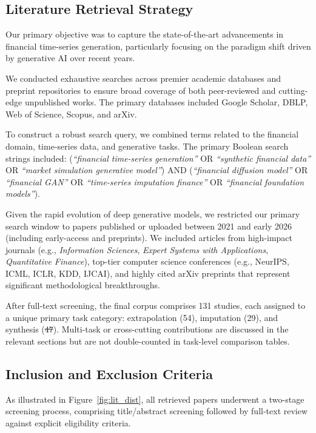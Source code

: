 \documentclass[11pt,a4paper]{article}
\makeatletter
\providecommand{\DIFaddtex}[1]{{\protect\color{blue}\uwave{#1}}} %
\providecommand{\DIFdeltex}[1]{{\protect\color{red}\sout{#1}}} %
\providecommand{\DIFaddbegin}{} %
\providecommand{\DIFaddend}{} %
\providecommand{\DIFdelbegin}{} %
\providecommand{\DIFdelend}{} %
\providecommand{\DIFadd}[1]{\texorpdfstring{\DIFaddtex{#1}}{#1}} %
\providecommand{\DIFdel}[1]{\texorpdfstring{\DIFdeltex{#1}}{}} %
\providecommand{\DIFscaledelfig}{0.5}
\newlength{\DIFdelgraphicswidth} %
\newlength{\DIFdelgraphicsheight} %
\providecommand{\DIFaddincludegraphics}[2][]{{\color{blue}\fbox{\DIFOincludegraphics[#1]{#2}}}} %
\providecommand{\DIFdelincludegraphics}[2][]{%
\sbox{\DIFdelgraphicsbox}{\DIFOincludegraphics[#1]{#2}}%
\settoboxwidth{\DIFdelgraphicswidth}{\DIFdelgraphicsbox} %
\settoboxtotalheight{\DIFdelgraphicsheight}{\DIFdelgraphicsbox} %
\scalebox{\DIFscaledelfig}{%
\parbox[b]{\DIFdelgraphicswidth}{\usebox{\DIFdelgraphicsbox}\\[-\baselineskip] \rule{\DIFdelgraphicswidth}{0em}}\llap{\resizebox{\DIFdelgraphicswidth}{\DIFdelgraphicsheight}{%
\setlength{\unitlength}{\DIFdelgraphicswidth}%
\begin{picture}(1,1)%
\thicklines\linethickness{2pt} %
{\color[rgb]{1,0,0}\put(0,0){\framebox(1,1){}}}%
{\color[rgb]{1,0,0}\put(0,0){\line( 1,1){1}}}%
{\color[rgb]{1,0,0}\put(0,1){\line(1,-1){1}}}%
\end{picture}%
}\hspace*{3pt}}} %
} %
\DeclareRobustCommand{\DIFaddbegin}{\DIFOaddbegin \let\includegraphics\DIFaddincludegraphics} %
\DeclareRobustCommand{\DIFaddend}{\DIFOaddend \let\includegraphics\DIFOincludegraphics} %
\DeclareRobustCommand{\DIFdelbegin}{\DIFOdelbegin \let\includegraphics\DIFdelincludegraphics} %
\DeclareRobustCommand{\DIFdelend}{\DIFOaddend \let\includegraphics\DIFOincludegraphics} %
\let\sout@orig\sout %
\renewcommand{\sout}[1]{\ifmmode\text{\sout@orig{\ensuremath{#1}}}\else\sout@orig{#1}\fi} %
\makeatother
\begin{document}
\subsection{Literature Retrieval Strategy}
Our primary objective was to capture the state-of-the-art advancements in financial time-series generation, particularly focusing on the paradigm shift driven by generative AI over recent years.

We conducted exhaustive searches across premier academic databases and preprint repositories to ensure broad coverage of both peer-reviewed and cutting-edge unpublished works. The primary databases included Google Scholar, DBLP, Web of Science, Scopus, and arXiv.

To construct a robust search query, we combined terms related to the financial domain, time-series data, and generative tasks. The primary Boolean search strings included:
(\textit{``financial time-series generation''} OR \textit{``synthetic financial data''} OR \textit{``market simulation generative model''}) AND (\textit{``financial diffusion model''} OR \textit{``financial GAN''} OR \textit{``time-series imputation finance''} OR \textit{``financial foundation models''}).

Given the rapid evolution of deep generative models, we restricted our primary search window to papers published or uploaded between 2021 and early 2026 (including early-access and preprints). We included articles from high-impact journals (e.g., \textit{Information Sciences}, \textit{Expert Systems with Applications}, \textit{Quantitative Finance}), top-tier computer science conferences (e.g., NeurIPS, ICML, ICLR, KDD, IJCAI), and highly cited arXiv preprints that represent significant methodological breakthroughs.

After full-text screening, the final corpus comprises 131 studies, each assigned to a unique primary task category: extrapolation (54), imputation (29), and synthesis (\DIFdelbegin \DIFdel{47}\DIFdelend \DIFaddbegin \DIFadd{48}\DIFaddend ). Multi-task or cross-cutting contributions are discussed in the relevant sections but are not double-counted in task-level comparison tables.

\subsection{Inclusion and Exclusion Criteria}
As illustrated in Figure~\ref{fig:lit_dist}, all retrieved papers underwent a two-stage screening process, comprising title/abstract screening followed by full-text review against explicit eligibility criteria.
\end{document}
